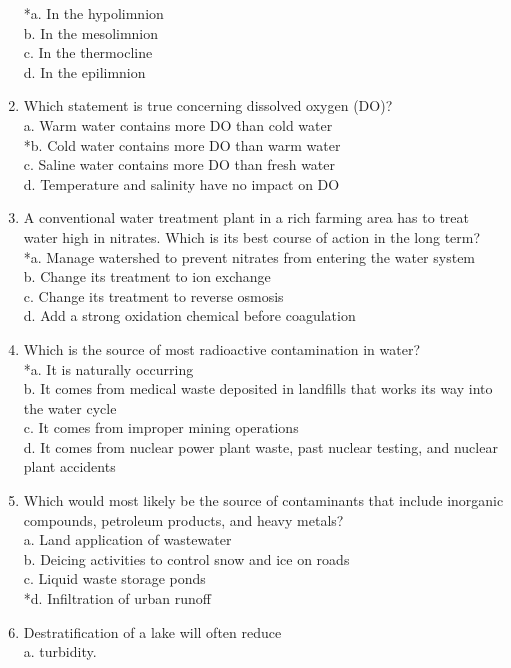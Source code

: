 \begin{enumerate}
*a. In the hypolimnion\\
b. In the mesolimnion\\
c. In the thermocline\\
d. In the epilimnion\\
\item Which statement is true concerning dissolved oxygen (DO)?\\
a. Warm water contains more DO than cold water\\
*b. Cold water contains more DO than warm water\\
c. Saline water contains more DO than fresh water\\
d. Temperature and salinity have no impact on DO\\
\item A conventional water treatment plant in a rich farming area has to treat water high in nitrates. Which is its best course of action in the long term?\\
*a. Manage watershed to prevent nitrates from entering the water system\\
b. Change its treatment to ion exchange\\
c. Change its treatment to reverse osmosis\\
d. Add a strong oxidation chemical before coagulation\\
\item Which is the source of most radioactive contamination in water?\\
*a. It is naturally occurring\\
b. It comes from medical waste deposited in landfills that works its way into the water cycle\\
c. It comes from improper mining operations\\
d. It comes from nuclear power plant waste, past nuclear testing, and nuclear plant accidents\\
\item Which would most likely be the source of contaminants that include inorganic compounds, petroleum products, and heavy metals?\\
a. Land application of wastewater\\
b. Deicing activities to control snow and ice on roads\\
c. Liquid waste storage ponds\\
*d. Infiltration of urban runoff
\item Destratification of a lake will often reduce\\
a. turbidity.\\

\end{enumerate}
